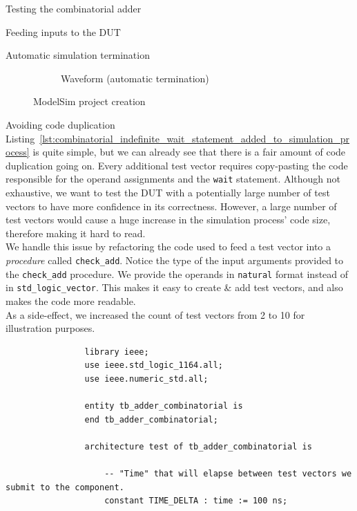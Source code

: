 \documentclass[a4paper, 12pt, onecolumn]{article}
\begin{document}
\begin{section}{Testing the combinatorial adder}
\begin{subsection}{Feeding inputs to the DUT}
\begin{subsubsection}{Automatic simulation termination}
\begin{figure}[!h]
\begin{subfigure}[t]{0.55\textwidth}
                    \caption{Waveform (automatic termination)}
                    \label{fig:waveform_combinatorial_process_automatically_terminates}
                \end{subfigure}
                \caption{ModelSim project creation}
            \end{figure}
        \end{subsubsection}

        \clearpage

        \begin{subsubsection}{Avoiding code duplication}
            Listing~\ref{lst:combinatorial_indefinite_wait_statement_added_to_simulation_process} is quite simple, but we can already see that there is a fair amount of code duplication going on. Every additional test vector requires copy-pasting the code responsible for the operand assignments and the \texttt{wait} statement. Although not exhaustive, we want to test the DUT with a potentially large number of test vectors to have more confidence in its correctness. However, a large number of test vectors would cause a huge increase in the simulation process' code size, therefore making it hard to read. \\

            We handle this issue by refactoring the code used to feed a test vector into a \emph{procedure} called \texttt{check\_add}. Notice the type of the input arguments provided to the \texttt{check\_add} procedure. We provide the operands in \texttt{natural} format instead of in \texttt{std\_logic\_vector}. This makes it easy to create \& add test vectors, and also makes the code more readable. \\

            As a side-effect, we increased the count of test vectors from 2 to 10 for illustration purposes.

            \begin{verbatim}
                library ieee;
                use ieee.std_logic_1164.all;
                use ieee.numeric_std.all;

                entity tb_adder_combinatorial is
                end tb_adder_combinatorial;

                architecture test of tb_adder_combinatorial is

                    -- "Time" that will elapse between test vectors we submit to the component.
                    constant TIME_DELTA : time := 100 ns;


\end{verbatim}
\end{subsubsection}
\end{subsection}
\end{section}
\end{document}
